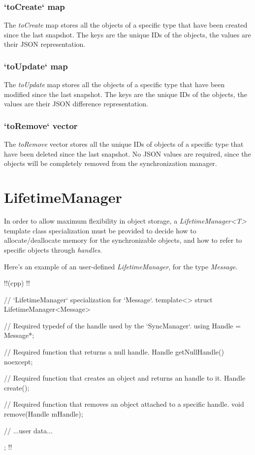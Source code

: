 \documentclass{report}
\begin{document}
                \subsubsection{`toCreate` map}

                    The \emph{toCreate} map stores all the objects of a specific type that have been created since the last snapshot.
                    The keys are the unique IDs of the objects, the values are their JSON representation.

                \subsubsection{`toUpdate` map}

                    The \emph{toUpdate} map stores all the objects of a specific type that have been modified since the last snapshot.
                    The keys are the unique IDs of the objects, the values are their JSON difference representation.

                \subsubsection{`toRemove` vector}

                    The \emph{toRemove} vector stores all the unique IDs of objects of a specific type that have been deleted since the last snapshot.
                    No JSON values are required, since the objects will be completely removed from the synchronization manager.
        
        \section{LifetimeManager}

            In order to allow maximum flexibility in object storage, a \emph{LifetimeManager<T>} template class specialization must be provided to decide how to allocate/deallocate memory for the synchronizable objects, and how to refer to specific objects through \emph{handles}.

            Here's an example of an user-defined \emph{LifetimeManager}, for the type \emph{Message}.

!!(cpp)    
!!{
    // `LifetimeManager` specialization for `Message`.
    template<> struct LifetimeManager<Message>
    {
        // Required typedef of the handle used by the `SyncManager`.
        using Handle = Message*;

        // Required function that returns a null handle.
        Handle getNullHandle() noexcept;

        // Required function that creates an object and returns an handle to it.
        Handle create();

        // Required function that removes an object attached to a specific handle.
        void remove(Handle mHandle);
        
        // ...user data...
    };
!!}
\end{document}

